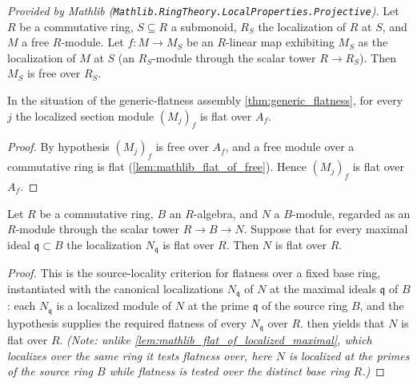 \begin{lemma}
  \label{lem:mathlib_free_of_isLocalizedModule}
  \mathlibok
  \textit{Provided by Mathlib (\texttt{Mathlib.RingTheory.LocalProperties.Projective}).}
  Let \(R\) be a commutative ring, \(S \subseteq R\) a submonoid, \(R_S\) the localization
  of \(R\) at \(S\), and \(M\) a free \(R\)-module. Let \(f : M \to M_S\) be an \(R\)-linear
  map exhibiting \(M_S\) as the localization of \(M\) at \(S\) (an \(R_S\)-module through the
  scalar tower \(R \to R_S\)). Then \(M_S\) is free over \(R_S\).
\end{lemma}

\begin{lemma}
  \label{lem:gf_patch_free_imp_flat}
  In the situation of the generic-flatness assembly \cref{thm:generic_flatness}, for every
  \(j\) the localized section module \((M_j)_f\) is flat over \(A_f\).
\end{lemma}

\begin{proof}
  \leanok
  By hypothesis \((M_j)_f\) is free over \(A_f\), and a free module over a
  commutative ring is flat (\cref{lem:mathlib_flat_of_free}). Hence \((M_j)_f\) is
  flat over \(A_f\).
\end{proof}

\begin{lemma}
  \label{lem:gf_flat_base_local_on_source}
  Let \(R\) be a commutative ring, \(B\) an \(R\)-algebra, and \(N\) a \(B\)-module,
  regarded as an \(R\)-module through the scalar tower \(R \to B \to N\). Suppose
  that for every maximal ideal \(\mathfrak q \subset B\) the localization
  \(N_{\mathfrak q}\) is flat over \(R\). Then \(N\) is flat over \(R\).
\end{lemma}

\begin{proof}
  \leanok
  This is the source-locality criterion for flatness over a fixed base ring,
  instantiated with the canonical localizations \(N_{\mathfrak q}\) of \(N\) at the
  maximal ideals \(\mathfrak q\) of \(B\): each \(N_{\mathfrak q}\) is a localized
  module of \(N\) at the prime \(\mathfrak q\) of the source ring \(B\), and the
  hypothesis supplies the required flatness of every \(N_{\mathfrak q}\) over \(R\).
   then yields that \(N\) is flat over
  \(R\). \emph{(Note: unlike \cref{lem:mathlib_flat_of_localized_maximal}, which
  localizes over the same ring it tests flatness over, here \(N\) is localized at the
  primes of the source ring \(B\) while flatness is tested over the distinct base
  ring \(R\).)}
\end{proof}

